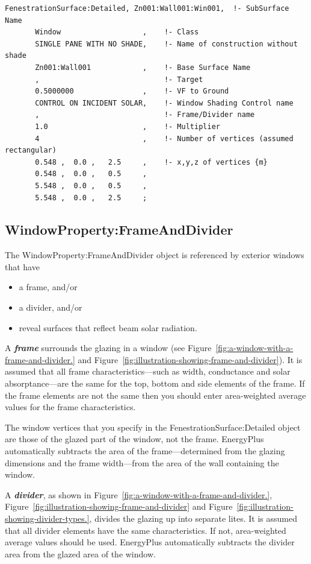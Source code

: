\begin{lstlisting}
FenestrationSurface:Detailed, Zn001:Wall001:Win001,  !- SubSurface Name
       Window                   ,    !- Class
       SINGLE PANE WITH NO SHADE,    !- Name of construction without shade
       Zn001:Wall001            ,    !- Base Surface Name
       ,                             !- Target
       0.5000000                ,    !- VF to Ground
       CONTROL ON INCIDENT SOLAR,    !- Window Shading Control name
       ,                             !- Frame/Divider name
       1.0                      ,    !- Multiplier
       4                        ,    !- Number of vertices (assumed rectangular)
       0.548 ,  0.0 ,   2.5     ,    !- x,y,z of vertices {m}
       0.548 ,  0.0 ,   0.5     ,
       5.548 ,  0.0 ,   0.5     ,
       5.548 ,  0.0 ,   2.5     ;
\end{lstlisting}

\subsection{WindowProperty:FrameAndDivider}\label{windowpropertyframeanddivider}

The WindowProperty:FrameAndDivider object is referenced by exterior windows that have

\begin{itemize}
\item
  a frame, and/or
\item
  a divider, and/or
\item
  reveal surfaces that reflect beam solar radiation.
\end{itemize}

A \textbf{\emph{frame}} surrounds the glazing in a window (see Figure~\ref{fig:a-window-with-a-frame-and-divider.} and Figure~\ref{fig:illustration-showing-frame-and-divider}). It is assumed that all frame characteristics---such as width, conductance and solar absorptance---are the same for the top, bottom and side elements of the frame. If the frame elements are not the same then you should enter area-weighted average values for the frame characteristics.

The window vertices that you specify in the FenestrationSurface:Detailed object are those of the glazed part of the window, not the frame. EnergyPlus automatically subtracts the area of the frame---determined from the glazing dimensions and the frame width---from the area of the wall containing the window.

A \textbf{\emph{divider}}, as shown in Figure~\ref{fig:a-window-with-a-frame-and-divider.}, Figure~\ref{fig:illustration-showing-frame-and-divider} and Figure~\ref{fig:illustration-showing-divider-types.}, divides the glazing up into separate lites. It is assumed that all divider elements have the same characteristics. If not, area-weighted average values should be used. EnergyPlus automatically subtracts the divider area from the glazed area of the window.

